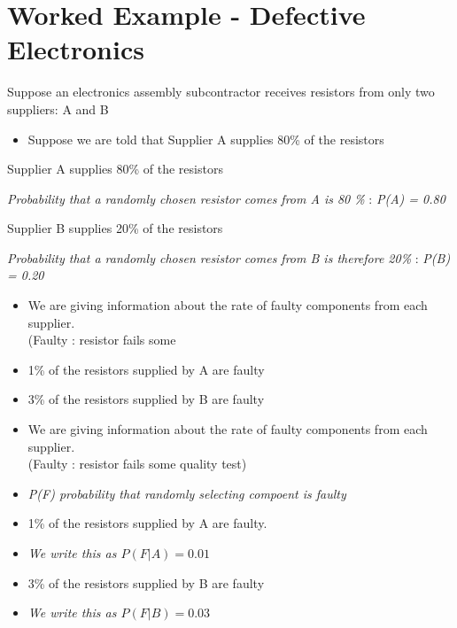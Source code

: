 \documentclass[]{report}
\begin{document}
\section{Worked Example  - Defective Electronics}		
Suppose an electronics assembly subcontractor receives resistors from only two suppliers: A and B

\begin{itemize}
	\item Suppose we are told that Supplier A supplies 80\% of the resistors
	
	
	
\end{itemize}

\begin{framed}			
	\begin{itemize}
		\item Supplier A supplies 80\% of the resistors
		{
			
			
			\item \textit{Probability that a randomly chosen resistor comes from A is 80 \%} : \textit{P(A) = 0.80 }
			
		}
		\item Supplier B supplies 20\% of the resistors
		\item \textit{Probability that a randomly chosen resistor comes from B is therefore 20\%} : \textit{P(B) = 0.20}
	\end{itemize}
\end{framed}	



\begin{itemize}
	\item We are giving information about the rate of faulty components from each supplier. \\(Faulty : resistor fails some 
	\item 1\% of the resistors supplied by A are faulty
	
	\item 3\% of the resistors supplied by B are faulty 
	\vspace{1cm}
\end{itemize}

\begin{itemize}
	\item We are giving information about the rate of faulty components from each supplier. \\(Faulty : resistor fails some quality test)
	\item  \textit{P(F) probability that randomly selecting compoent is faulty}
	\item 1\% of the resistors supplied by A are faulty.
	\item\textit{ We write this as $P(F|A) =0.01$}
	\item 3\% of the resistors supplied by B are faulty 
	\item \textit{We write this as $P(F|B) =0.03$}
\end{itemize}
\end{document}
